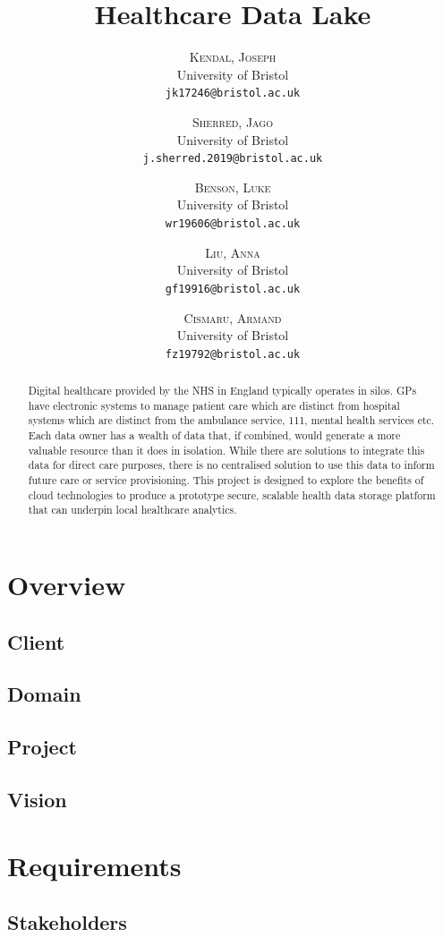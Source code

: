\documentclass[10pt]{article}
\title{Healthcare Data Lake}
\author{
	\textsc{Kendal, Joseph}\\
	\normalsize University of Bristol\\
	\texttt{jk17246@bristol.ac.uk}
	
	\and
	
	\textsc{Sherred, Jago}\\
	\normalsize University of Bristol\\
	\texttt{j.sherred.2019@bristol.ac.uk}
	
	\and
	
	\textsc{Benson, Luke}\\
	\normalsize University of Bristol\\
	\texttt{wr19606@bristol.ac.uk}
	
	\and
	
	\textsc{Liu, Anna}\\
	\normalsize University of Bristol\\
	\texttt{gf19916@bristol.ac.uk}
	
	\and
	
	\textsc{Cismaru, Armand}\\
	\normalsize University of Bristol\\
	\texttt{fz19792@bristol.ac.uk}
}
\begin{document}
\maketitle    


\begin{abstract}

Digital healthcare provided by the NHS in England typically operates in silos. GPs have electronic systems to manage patient care which are distinct from hospital systems which are distinct from the ambulance service, 111, mental health services etc. Each data owner has a wealth of data that, if combined, would generate a more valuable resource than it does in isolation. While there are solutions to integrate this data for direct care purposes, there is no centralised solution to use this data to inform future care or service provisioning. This project is designed to explore the benefits of cloud technologies to produce a prototype secure, scalable health data storage platform that can underpin local healthcare analytics.

\end{abstract}

\section{Overview}

\subsection{Client}
\subsection{Domain}
\subsection{Project}
\subsection{Vision}

\newpage


\section{Requirements}
\subsection{Stakeholders}
\end{document}
